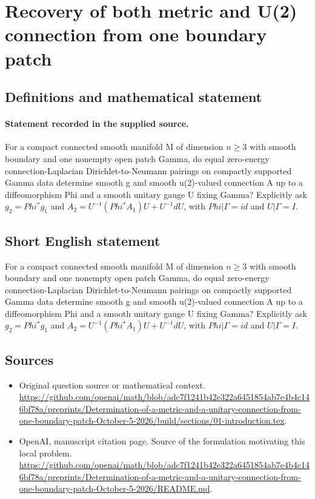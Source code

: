 \documentclass[11pt]{article}
\begin{document}
\section*{Recovery of both metric and U(2) connection from one boundary patch}\label{30007330}
\subsection{Definitions and mathematical statement}
\paragraph{Statement recorded in the supplied source.}
For a compact connected smooth manifold M of dimension $n\geq 3$ with smooth boundary and one nonempty open patch Gamma, do equal zero-energy connection-Laplacian Dirichlet-to-Neumann pairings on compactly supported Gamma data determine smooth g and smooth u(2)-valued connection A up to a diffeomorphism Phi and a smooth unitary gauge U fixing Gamma? Explicitly ask $g_2=Phi^*g_1$ and $A_2=U^{-1}(Phi^*A_1)U+U^{-1}dU$, with $Phi|\Gamma =id$ and $U|\Gamma =I$.
\subsection{Short English statement}
For a compact connected smooth manifold M of dimension $n\geq 3$ with smooth boundary and one nonempty open patch Gamma, do equal zero-energy connection-Laplacian Dirichlet-to-Neumann pairings on compactly supported Gamma data determine smooth g and smooth u(2)-valued connection A up to a diffeomorphism Phi and a smooth unitary gauge U fixing Gamma? Explicitly ask $g_2=Phi^*g_1$ and $A_2=U^{-1}(Phi^*A_1)U+U^{-1}dU$, with $Phi|\Gamma =id$ and $U|\Gamma =I$.
\subsection{Sources}
\begin{itemize}
\item[S1] Original question source or mathematical context.
\url{https://github.com/openai/math/blob/adc7f1241b42e322a6451854ab7e4b4c146bf78a/preprints/Determination-of-a-metric-and-a-unitary-connection-from-one-boundary-patch-October-5-2026/build/sections/01-introduction.tex}.
\item[S2] OpenAI, manuscript citation page. Source of the formulation motivating this local problem.
\url{https://github.com/openai/math/blob/adc7f1241b42e322a6451854ab7e4b4c146bf78a/preprints/Determination-of-a-metric-and-a-unitary-connection-from-one-boundary-patch-October-5-2026/README.md}.
\end{itemize}
\end{document}
